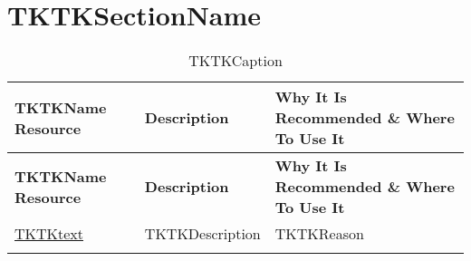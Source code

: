 \clearpage
\section{TKTKSectionName}
\setlength\LTleft{0pt}
\setlength\LTright{0pt}
\begin{longtable}[c]{|p{}|p{}|p{}|}
  \hline
  \rowcolor{owasplightpurple}
  \textbf{TKTKName Resource} &
  \textbf{Description} &
  \textbf{Why It Is Recommended \& Where To Use It} \\
  \hline
  \endfirsthead
  \hline
  \rowcolor{owasplightpurple}
  \textbf{TKTKName Resource} &
  \textbf{Description} &
  \textbf{Why It Is Recommended \& Where To Use It} \\
  \hline
  \endhead
  \endfoot
  \href{TKTKlink}{TKTKtext} &
  TKTKDescription &
  TKTKReason \\
  \hline
  \caption{TKTKCaption}
  \label{tab:TKTKlabel}
\end{longtable}